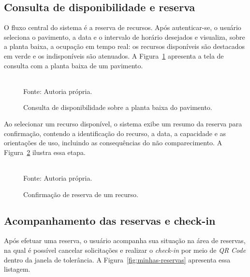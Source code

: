 \subsection{Consulta de disponibilidade e reserva}\label{subsec:demo-reserva}

O fluxo central do sistema é a reserva de recursos. Após autenticar-se, o usuário seleciona o pavimento, a data e o intervalo de horário desejados e visualiza, sobre a planta baixa, a ocupação em tempo real: os recursos disponíveis são destacados em verde e os indisponíveis são atenuados. A Figura~\ref{fig:mapa-consulta} apresenta a tela de consulta com a planta baixa de um pavimento.

\begin{figure}[H]
  \centering
  \framebox[0.9\textwidth]{\rule{0pt}{8cm}}%
  \caption{Consulta de disponibilidade sobre a planta baixa do pavimento.}
  \label{fig:mapa-consulta}\\
  {\footnotesize Fonte: Autoria própria.}
\end{figure}

Ao selecionar um recurso disponível, o sistema exibe um resumo da reserva para confirmação, contendo a identificação do recurso, a data, a capacidade e as orientações de uso, incluindo as consequências do não comparecimento. A Figura~\ref{fig:modal-confirmacao} ilustra essa etapa.

\begin{figure}[H]
  \centering
  \framebox[0.6\textwidth]{\rule{0pt}{6cm}}%
  \caption{Confirmação de reserva de um recurso.}
  \label{fig:modal-confirmacao}\\
  {\footnotesize Fonte: Autoria própria.}
\end{figure}

\subsection{Acompanhamento das reservas e check-in}\label{subsec:demo-minhas-reservas}

Após efetuar uma reserva, o usuário acompanha sua situação na área de reservas, na qual é possível cancelar solicitações e realizar o \textit{check-in} por meio de \textit{QR Code} dentro da janela de tolerância. A Figura~\ref{fig:minhas-reservas} apresenta essa listagem.

